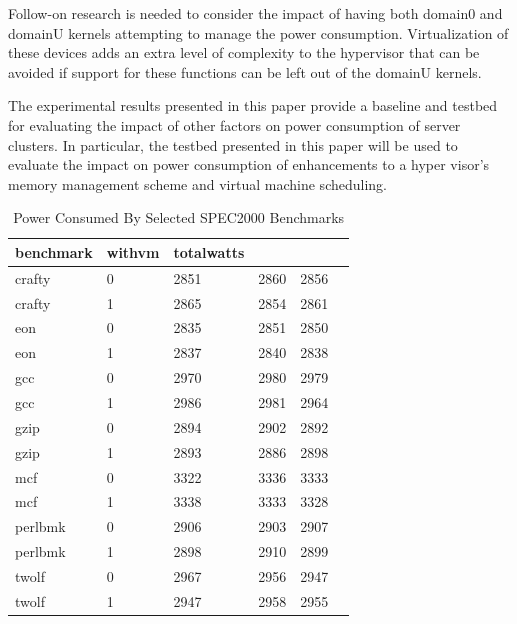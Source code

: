 \documentclass[preprint]{sigplanconf}
\begin{document}
Follow-on research is needed to consider the impact of having both domain0 and
domainU kernels attempting to manage the power consumption.  Virtualization of
 these devices adds an extra level of complexity to the hypervisor that can
be avoided if support for these functions can be left out of the domainU
kernels.

The experimental results presented in this paper provide a baseline and
testbed for evaluating the impact of other factors on power consumption of
server clusters.  In particular, the testbed presented in this paper will be
used to evaluate the impact on power consumption of enhancements to a
hyper visor's memory management scheme and virtual machine scheduling.

\label{sec:References}
\nocite{*}



\begin{table}
  \centering
  \begin{tabular}{l|l|l|lll}
    benchmark&withvm&totalwatts&&\\
    \hline
    crafty&0&2851&2860&2856\\
    crafty&1&2865&2854&2861\\
    eon&0&2835&2851&2850\\
    eon&1&2837&2840&2838\\
    gcc&0&2970&2980&2979\\
    gcc&1&2986&2981&2964\\
    gzip&0&2894&2902&2892\\
    gzip&1&2893&2886&2898\\
    mcf&0&3322&3336&3333\\
    mcf&1&3338&3333&3328\\
    perlbmk&0&2906&2903&2907\\
    perlbmk&1&2898&2910&2899\\
    twolf&0&2967&2956&2947\\
    twolf&1&2947&2958&2955\\
  \end{tabular}
  \caption{Power Consumed By Selected SPEC2000 Benchmarks}
  \label{tab:SingleTab}
\end{table}
\end{document}
